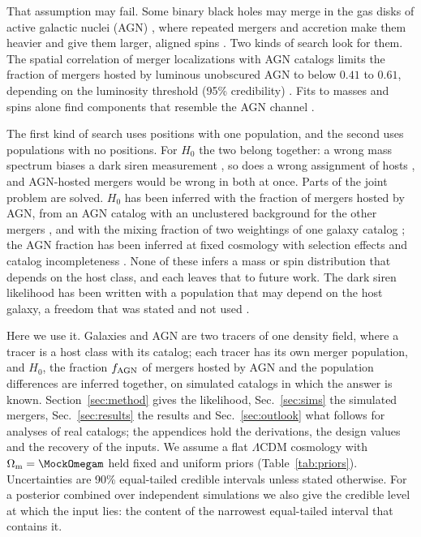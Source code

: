 \documentclass[aps,prd,reprint,superscriptaddress,nofootinbib,nolongbibliography,floatfix]{revtex4-2}
\newcommand{\fagn}{f_{\rm AGN}}
\begin{document}
That assumption may fail.
Some binary black holes may merge in the gas disks of active galactic nuclei (AGN) \cite{Bartos:2016dgn,Stone:2016wzz,Mckernan:2017ssq,Tagawa:2019osr}, where repeated mergers and accretion make them heavier and give them larger, aligned spins \cite{Yang:2019okq,Yang:2019cbr,Tagawa:2020dxe,Tagawa:2021ofj,McKernan:2021nwk}.
Two kinds of search look for them.
The spatial correlation of merger localizations with AGN catalogs \cite{Bartos:2017ggb,Veronesi:2023ugk,Veronesi:2024tef,Zhu:2025rdv} limits the fraction of mergers hosted by luminous unobscured AGN to below $0.41$ to $0.61$, depending on the luminosity threshold (95\% credibility) \cite{Pouw:2026lar}.
Fits to masses and spins alone find components that resemble the AGN channel \cite{Gayathri:2021xwb,Gayathri:2023bha,Bartos:2026xlt,Li:2025iux}.

The first kind of search uses positions with one population, and the second uses populations with no positions.
For $H_0$ the two belong together: a wrong mass spectrum biases a dark siren measurement \cite{Mastrogiovanni:2021wsd,Pierra:2023deu}, so does a wrong assignment of hosts \cite{Hanselman:2024hqy,Perna:2024lod,Alfradique:2025tbj}, and AGN-hosted mergers would be wrong in both at once.
Parts of the joint problem are solved.
$H_0$ has been inferred with the fraction of mergers hosted by AGN, from an AGN catalog with an unclustered background for the other mergers \cite{Bom:2023zgw}, and with the mixing fraction of two weightings of one galaxy catalog \cite{Cross-Parkin:2026pua}; the AGN fraction has been inferred at fixed cosmology with selection effects and catalog incompleteness \cite{Pouw:2026lar}.
None of these infers a mass or spin distribution that depends on the host class, and each leaves that to future work.
The dark siren likelihood has been written with a population that may depend on the host galaxy, a freedom that was stated and not used \cite{Mastrogiovanni:2023emh}.

Here we use it.
Galaxies and AGN are two tracers of one density field, where a tracer is a host class with its catalog; each tracer has its own merger population, and $H_0$, the fraction $\fagn$ of mergers hosted by AGN and the population differences are inferred together, on simulated catalogs in which the answer is known.
Section~\ref{sec:method} gives the likelihood, Sec.~\ref{sec:sims} the simulated mergers, Sec.~\ref{sec:results} the results and Sec.~\ref{sec:outlook} what follows for analyses of real catalogs; the appendices hold the derivations, the design values and the recovery of the inputs.
We assume a flat $\Lambda$CDM cosmology with $\Omega_{\rm m}=\MockOmegam$ held fixed \cite{Planck:2015fie} and uniform priors (Table~\ref{tab:priors}).
Uncertainties are 90\% equal-tailed credible intervals unless stated otherwise.
For a posterior combined over independent simulations we also give the credible level at which the input lies: the content of the narrowest equal-tailed interval that contains it.
\end{document}
